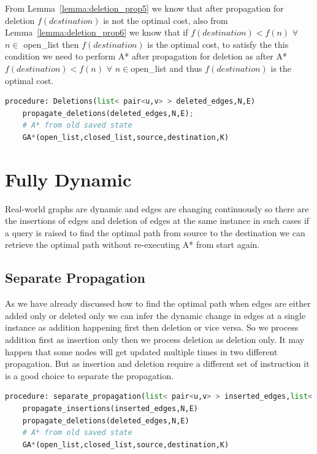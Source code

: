 \documentclass[a4paper]{article}
\begin{document}
From Lemma~\ref{lemma:deletion_prop5} we know that after propagation for deletion $f(destination)$ is not the optimal cost, also from Lemma~\ref{lemma:deletion_prop6} we know that if $f(destination) < f(n)$ $ \forall$ $n \in $ open\_list then $f(destination)$ is the optimal cost, to satisfy the this condition we need to perform A* after propagation for deletion as after A* $f(destination) < f(n)$ $ \forall$ $n \in $open\_list and thus $f(destination)$ is the optimal cost.
\begin{lstlisting}[language=python, caption= Procedure for Deletions]
procedure: Deletions(list< pair<u,v> > deleted_edges,N,E)
    propagate_deletions(deleted_edges,N,E);
    # A* from old saved state
    GA*(open_list,closed_list,source,destination,K)

\end{lstlisting}
\section{Fully Dynamic}\label{sec:fully_dynamic}
Real-world graphs are dynamic and edges are changing continuously so there are the insertions of edges and deletion of edges at the same instance in such cases if a query is raised to find the optimal path from source to the destination we can retrieve the optimal path without re-executing A* from start again.

\subsection{Separate Propagation}\label{subsec:sep_propagation}
As we have already discussed how to find the optimal path when edges are either added only or deleted only we can infer the dynamic change in edges at a single instance as addition happening first then deletion or vice versa. So we process addition first as insertion only then we process deletion as deletion only. It may happen that some nodes will get updated multiple times in two different propagation. But as insertion and deletion require a different set of instruction it is a good choice to separate the propagation.
\begin{lstlisting}[language=python, caption=Separate Propagation]
procedure: separate_propagation(list< pair<u,v> > inserted_edges,list< pair<u,v> > deleted_edges,N,E)
    propagate_insertions(inserted_edges,N,E)
    propagate_deletions(deleted_edges,N,E)
    # A* from old saved state
    GA*(open_list,closed_list,source,destination,K)
\end{lstlisting}
\end{document}
